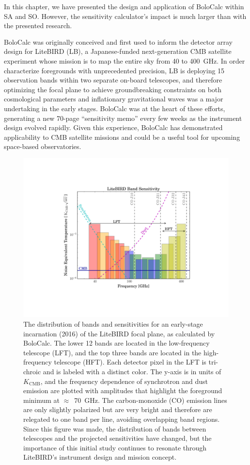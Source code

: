 In this chapter, we have presented the design and application of BoloCalc within SA and SO. However, the sensitivity calculator's impact is much larger than with the presented research. 

BoloCalc was originally conceived and first used to inform the detector array design for LiteBIRD (LB), a Japanese-funded next-generation CMB satellite experiment whose mission is to map the entire sky from 40 to 400~GHz. In order characterize foregrounds with unprecedented precision, LB is deploying 15 observation bands within two separate on-board telescopes, and therefore optimizing the focal plane to achieve groundbreaking constraints on both cosmological parameters and inflationary gravitational waves was a major undertaking in the early stages. BoloCalc was at the heart of these efforts, generating a new 70-page ``sensitivity memo'' every few weeks as the instrument design evolved rapidly. Given this experience, BoloCalc has demonstrated applicability to CMB satellite missions and could be a useful tool for upcoming space-based observatories.

\begin{figure}
    \centering
    \includegraphics[width=0.7\linewidth, trim=5cm 3.5cm 5cm 3.5cm, clip]{BoloCalc/Figures/LiteBIRD_sensitivity.pdf}
    \caption{The distribution of bands and sensitivities for an early-stage incarnation (2016) of the LiteBIRD focal plane, as calculated by BoloCalc. The lower 12 bands are located in the low-frequency telescope (LFT), and the top three bands are located in the high-frequency telescope (HFT). Each detector pixel in the LFT is tri-chroic and is labeled with a distinct color. The y-axis is in units of $K_{\mathrm{CMB}}$, and the frequency dependence of synchrotron and dust emission are plotted with amplitudes that highlight the foreground minimum at $\approx$~70~GHz. The carbon-monoxide (CO) emission lines are only slightly polarized but are very bright and therefore are relegated to one band per line, avoiding overlapping band regions. Since this figure was made, the distribution of bands between telescopes and the projected sensitivities have changed, but the importance of this initial study continues to resonate through LiteBIRD's instrument design and mission concept.}
    \label{fig:litebird_bands}
\end{figure}

